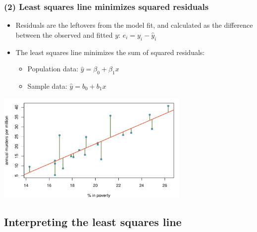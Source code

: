 \documentclass[slidestop,compress,mathserif,12pt,t,professionalfonts,xcolor=table]{beamer}
\begin{document}
\begin{frame}
\frametitle{(2) Least squares line minimizes squared residuals}

\begin{itemize}

\item Residuals are the leftovers from the model fit, and calculated as the difference between the observed and fitted $y$: $e_i = y_i - \hat{y}_i$

\item The least squares line minimizes the sum of squared residuals:
\begin{itemize}
\item Population data: $\hat{y} = \beta_0 + \beta_1 x$
\item Sample data: $\hat{y} = b_0 + b_1 x$
\end{itemize}

\end{itemize}

\begin{center}
\includegraphics[width=0.7\textwidth]{figures/murder/annual_murders_per_mil_perc_pov_res}
\end{center}

\end{frame}


\subsection{Interpreting the least squares line}
\label{mi3}

\end{document}
